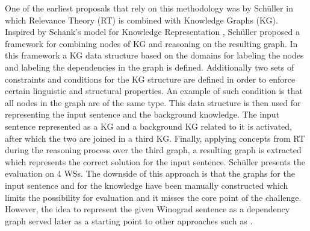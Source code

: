One of the earliest proposals that rely on this methodology was by Sch{\"u}ller \cite{DBLP:conf/kr/Schuller14} in which Relevance Theory (RT) \cite{Wilson2002-WILRT} is combined with Knowledge Graphs (KG). Inspired by Schank's model for Knowledge Representation \cite{SCHANK1972552}, Sch{\"u}ller proposed a framework for combining nodes of KG and reasoning on the resulting graph. 
In this framework a KG data structure based on the domains for labeling the nodes and labeling the dependencies in the graph is defined. Additionally two sets of constraints and conditions for the KG structure are defined in order to enforce certain linguistic and structural properties. An example of such condition is that all nodes in the graph are of the same type.  This data structure is then used for representing the input sentence and the background knowledge. 
The input sentence represented as a KG and a background KG related to it is activated, after which the two are joined in a third KG. Finally, applying concepts from RT during the reasoning process over the third graph, a resulting graph is extracted which represents the correct solution for the input sentence. Sch{\"u}ller \cite{DBLP:conf/kr/Schuller14} presents the evaluation on 4 WSs. The downside of this approach is that the graphs for the input sentence and for the knowledge have been manually constructed which limits the possibility for evaluation and it misses the core point of the challenge. However, the idea to represent the given Winograd sentence as a dependency graph served later as a starting point to other approaches such as \cite{DBLP:conf/ijcai/SharmaVAB15}.

